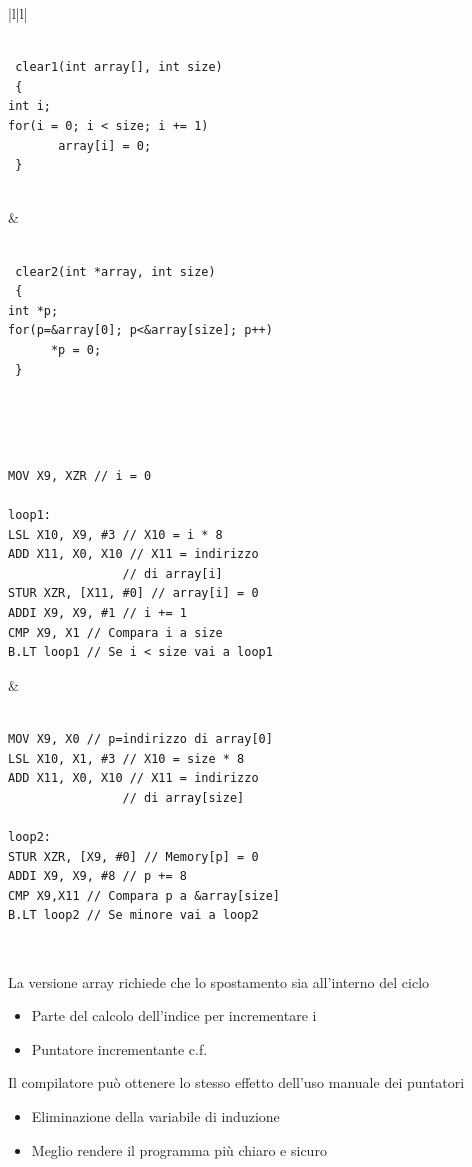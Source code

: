 \documentclass[12pt,a4paper]{article}
\begin{document}
\begin{center}
\begin{tabular}{|l|l|}
\hline
\begin{minipage}{.5\linewidth}
\begin{verbatim}

 clear1(int array[], int size)
 {
int i;
for(i = 0; i < size; i += 1)
       array[i] = 0;
 }
 
\end{verbatim}
\end{minipage} & 
\begin{minipage}{.5\linewidth}
\begin{verbatim}

 clear2(int *array, int size)
 {
int *p;
for(p=&array[0]; p<&array[size]; p++)
      *p = 0;
 }
 
\end{verbatim}
\end{minipage}\\ \hline
\begin{minipage}{.5\linewidth}
\begin{verbatim}

MOV X9, XZR // i = 0
      
loop1:
LSL X10, X9, #3 // X10 = i * 8
ADD X11, X0, X10 // X11 = indirizzo
                // di array[i]
STUR XZR, [X11, #0] // array[i] = 0
ADDI X9, X9, #1 // i += 1
CMP X9, X1 // Compara i a size
B.LT loop1 // Se i < size vai a loop1

\end{verbatim}
\end{minipage} &
\begin{minipage}{.5\linewidth}
\begin{verbatim}

MOV X9, X0 // p=indirizzo di array[0]
LSL X10, X1, #3 // X10 = size * 8
ADD X11, X0, X10 // X11 = indirizzo
                // di array[size]
      
loop2:
STUR XZR, [X9, #0] // Memory[p] = 0
ADDI X9, X9, #8 // p += 8
CMP X9,X11 // Compara p a &array[size]
B.LT loop2 // Se minore vai a loop2

\end{verbatim}
\end{minipage}\\ \hline
\end{tabular}
\end{center}
La versione array richiede che lo spostamento sia all'interno del ciclo
\begin{itemize}
\item Parte del calcolo dell'indice per incrementare i
\item Puntatore incrementante c.f.
\end{itemize}
Il compilatore può ottenere lo stesso effetto dell'uso manuale dei puntatori
\begin{itemize}
\item Eliminazione della variabile di induzione
\item Meglio rendere il programma più chiaro e sicuro
\end{itemize}
\end{document}
